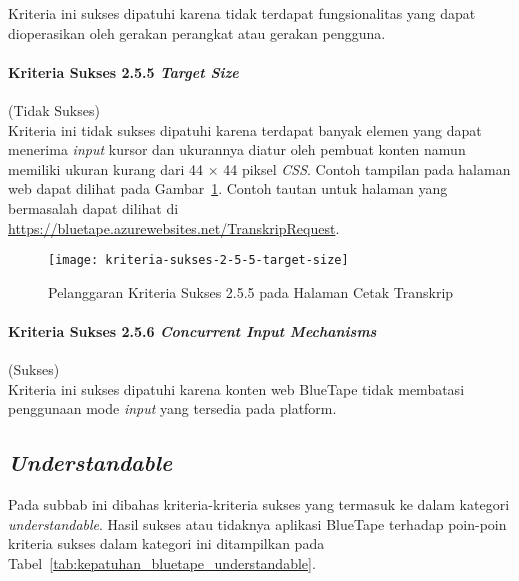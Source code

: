 Kriteria ini sukses dipatuhi karena tidak terdapat fungsionalitas yang dapat dioperasikan oleh gerakan perangkat atau gerakan pengguna.

\paragraph{Kriteria Sukses 2.5.5 \textit{Target Size}}
\label{par:kepatuhan_bluetape_kriteria_sukses_2.5.5}
(Tidak Sukses)\\

Kriteria ini tidak sukses dipatuhi karena terdapat banyak elemen yang dapat menerima \textit{input} kursor dan ukurannya diatur oleh pembuat konten namun memiliki ukuran kurang dari 44 $\times$ 44 piksel \textit{CSS}. Contoh tampilan pada halaman web dapat dilihat pada \mbox{Gambar \ref{fig:2.5.5_target_size}}. Contoh tautan untuk halaman yang bermasalah dapat dilihat di \url{https://bluetape.azurewebsites.net/TranskripRequest}.

\begin{figure}[H]
    \centering  
    \texttt{[image: kriteria-sukses-2-5-5-target-size]}  
    \caption[Pelanggaran Kriteria Sukses 2.5.5 pada Halaman Cetak Transkrip]{Pelanggaran Kriteria Sukses 2.5.5 pada Halaman Cetak Transkrip}
    \label{fig:2.5.5_target_size}  
\end{figure} 

\paragraph{Kriteria Sukses 2.5.6 \textit{Concurrent Input Mechanisms}}
\label{par:kepatuhan_bluetape_kriteria_sukses_2.5.6}
(Sukses)\\

Kriteria ini sukses dipatuhi karena konten web BlueTape tidak membatasi penggunaan mode \textit{input} yang tersedia pada platform.

\subsection{\textit{Understandable}}
\label{subsec:kepatuhan_bluetape_understandable}
Pada subbab ini dibahas kriteria-kriteria sukses yang termasuk ke dalam kategori \textit{understandable}. Hasil sukses atau tidaknya aplikasi BlueTape terhadap poin-poin kriteria sukses dalam kategori ini ditampilkan pada \mbox{Tabel \ref{tab:kepatuhan_bluetape_understandable}}.

